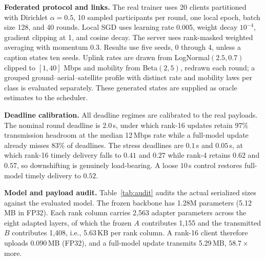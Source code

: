 \documentclass[preprint,12pt]{elsarticle}
\begin{document}
\textbf{Federated protocol and links.} The real trainer uses 20 clients partitioned with Dirichlet $\alpha=0.5$, 10 sampled participants per round, one local epoch, batch size 128, and 40 rounds. Local SGD uses learning rate 0.005, weight decay $10^{-4}$, gradient clipping at 1, and cosine decay. The server uses rank-masked weighted averaging with momentum 0.3. Results use five seeds, 0 through 4, unless a caption states ten seeds. Uplink rates are drawn from LogNormal$(2.5,0.7)$ clipped to $[1,40]$ Mbps and mobility from Beta$(2,5)$, redrawn each round; a grouped ground--aerial--satellite profile with distinct rate and mobility laws per class is evaluated separately. These generated states are supplied as oracle estimates to the scheduler.

\textbf{Deadline calibration.} All deadline regimes are calibrated to the real payloads. The nominal round deadline is $2.0$\,s, under which rank-16 updates retain $97\%$ transmission headroom at the median 12\,Mbps rate while a full-model update already misses $83\%$ of deadlines. The stress deadlines are $0.1$\,s and $0.05$\,s, at which rank-16 timely delivery falls to $0.41$ and $0.27$ while rank-4 retains $0.62$ and $0.57$, so downshifting is genuinely load-bearing. A loose $10$\,s control restores full-model timely delivery to $0.52$.

\textbf{Model and payload audit.} Table~\ref{tab:audit} audits the actual serialized sizes against the evaluated model. The frozen backbone has 1.28M parameters (5.12\,MB in FP32). Each rank column carries 2{,}563 adapter parameters across the eight adapted layers, of which the frozen $A$ contributes 1{,}155 and the transmitted $B$ contributes 1{,}408, i.e., 5.63\,KB per rank column. A rank-16 client therefore uploads 0.090\,MB (FP32), and a full-model update transmits 5.29\,MB, $58.7\times$ more.

\begin{table}[t]
\centering
\caption{Payload audit of real serialized update sizes. Frozen-$A$ clients upload only the trainable $B$ factor (1{,}408 parameters per rank column); the $A{+}B$ column is the joint-training equivalent. The stylized $s(r)$ column lists the normalized-cost protocol reused in the sensitivity study of Section~\ref{sec:simsim}.}
\label{tab:audit}
\end{table}
\end{document}
